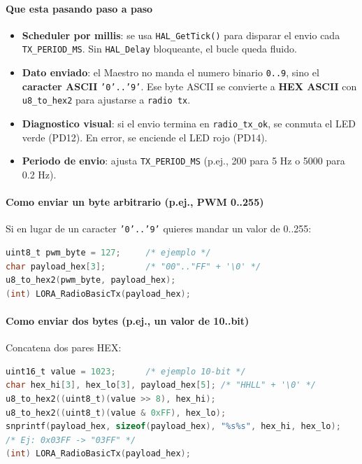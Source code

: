 \documentclass[a4paper,12pt]{article}
\begin{document}
\paragraph{Que esta pasando paso a paso}
\begin{itemize}
  \item \textbf{Scheduler por millis}: se usa \texttt{HAL\_GetTick()} para disparar el envio cada \texttt{TX\_PERIOD\_MS}. Sin \texttt{HAL\_Delay} bloqueante, el bucle queda fluido.
  \item \textbf{Dato enviado}: el Maestro no manda el numero binario \texttt{0..9}, sino el \textbf{caracter ASCII} \texttt{'0'..'9'}. Ese byte ASCII se convierte a \textbf{HEX ASCII} con \texttt{u8\_to\_hex2} para ajustarse a \texttt{radio tx}.
  \item \textbf{Diagnostico visual}: si el envio termina en \texttt{radio\_tx\_ok}, se conmuta el LED verde (PD12). En error, se enciende el LED rojo (PD14).
  \item \textbf{Periodo de envio}: ajusta \texttt{TX\_PERIOD\_MS} (p.ej., 200 para 5 Hz o 5000 para 0.2 Hz).
\end{itemize}

\paragraph{Como enviar un byte arbitrario (p.ej., PWM 0..255)}
Si en lugar de un caracter \texttt{'0'..'9'} quieres mandar un valor de 0..255:
\begin{lstlisting}[language=C]
uint8_t pwm_byte = 127;     /* ejemplo */
char payload_hex[3];        /* "00".."FF" + '\0' */
u8_to_hex2(pwm_byte, payload_hex);
(int) LORA_RadioBasicTx(payload_hex);
\end{lstlisting}

\newpage

\paragraph{Como enviar dos bytes (p.ej., un valor de 10..bit)}
Concatena dos pares HEX:
\begin{lstlisting}[language=C]
uint16_t value = 1023;      /* ejemplo 10-bit */
char hex_hi[3], hex_lo[3], payload_hex[5]; /* "HHLL" + '\0' */
u8_to_hex2((uint8_t)(value >> 8), hex_hi);
u8_to_hex2((uint8_t)(value & 0xFF), hex_lo);
snprintf(payload_hex, sizeof(payload_hex), "%s%s", hex_hi, hex_lo);
/* Ej: 0x03FF -> "03FF" */
(int) LORA_RadioBasicTx(payload_hex);
\end{lstlisting}
\end{document}

